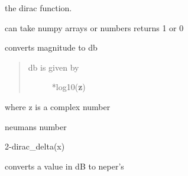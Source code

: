 \documentclass[letterpaper,10pt,english]{sphinxmanual}
\begin{document}

\begin{fulllineitems}
\label{api/mwavepy:mwavepy.mathFunctions.degree_2_radian}
\end{fulllineitems}


\begin{fulllineitems}
\label{api/mwavepy:mwavepy.mathFunctions.dirac_delta}
the dirac function.

can take numpy arrays or numbers
returns 1 or 0

\end{fulllineitems}


\begin{fulllineitems}
\label{api/mwavepy:mwavepy.mathFunctions.magnitude_2_db}
converts magnitude to db
\begin{quote}
\begin{description}
\item[{db is given by }] *log10({\color{red}\bfseries{}\textbar{}z\textbar{}})

\end{description}
\end{quote}

where z is a complex number

\end{fulllineitems}


\begin{fulllineitems}
\label{api/mwavepy:mwavepy.mathFunctions.neuman}
neumans number

2-dirac\_delta(x)

\end{fulllineitems}


\begin{fulllineitems}
\label{api/mwavepy:mwavepy.mathFunctions.np_2_db}
converts a value in dB to neper's

\end{fulllineitems}
\end{document}
